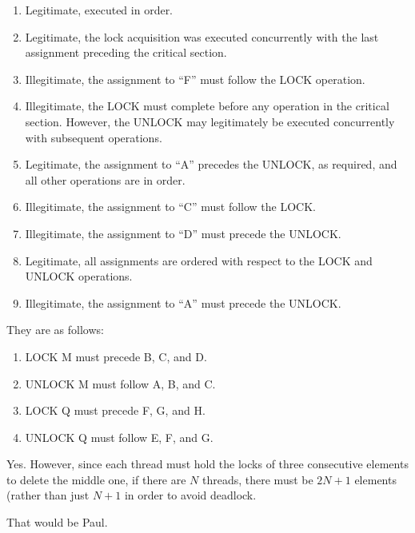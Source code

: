 	\begin{enumerate}
	\item	Legitimate, executed in order.
	\item	Legitimate, the lock acquisition was executed concurrently
		with the last assignment preceding the critical section.
	\item	Illegitimate, the assignment to ``F'' must follow the LOCK
		operation.
	\item	Illegitimate, the LOCK must complete before any operation in
		the critical section.  However, the UNLOCK may legitimately
		be executed concurrently with subsequent operations.
	\item	Legitimate, the assignment to ``A'' precedes the UNLOCK,
		as required, and all other operations are in order.
	\item	Illegitimate, the assignment to ``C'' must follow the LOCK.
	\item	Illegitimate, the assignment to ``D'' must precede the UNLOCK.
	\item	Legitimate, all assignments are ordered with respect to the
		LOCK and UNLOCK operations.
	\item	Illegitimate, the assignment to ``A'' must precede the UNLOCK.
	\end{enumerate}


	They are as follows:
	\begin{enumerate}
	\item	LOCK M must precede B, C, and D.
	\item	UNLOCK M must follow A, B, and C.
	\item	LOCK Q must precede F, G, and H.
	\item	UNLOCK Q must follow E, F, and G.
	\end{enumerate}


	Yes.
	However, since each thread must hold the locks of three
	consecutive elements to delete the middle one, if there
	are $N$ threads, there must be $2N+1$ elements (rather than
	just $N+1$ in order to avoid deadlock.


	That would be Paul.

